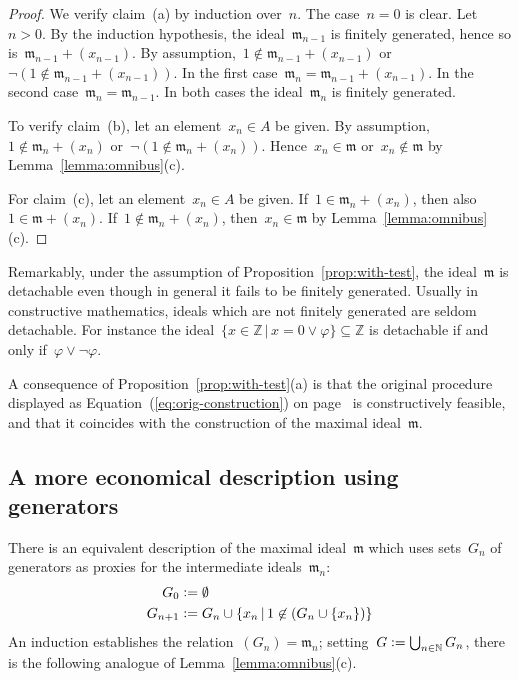 \documentclass[com,11pt,crcready]{iosart2x}
\theoremstyle{definition}
\theoremstyle{plain}
\theoremstyle{remark}
\newcommand{\?}{\,{:}\,}
\newcommand{\mmm}{\mathfrak{m}}
\newcommand{\NN}{\mathbb{N}}
\newcommand{\ZZ}{\mathbb{Z}}
\newcommand{\defeq}{\vcentcolon=}
\renewcommand{\_}{\mathpunct{.}\,}
\begin{document}
\begin{proof}We verify claim~(a) by induction over~$n$. The case~$n = 0$ is
clear. Let~$n > 0$. By the induction hypothesis, the ideal~$\mmm_{n-1}$ is finitely
generated, hence so is~$\mmm_{n-1} + (x_{n-1})$. By assumption,~$1 \not\in \mmm_{n-1} +
(x_{n-1})$ or~$\neg(1 \not\in \mmm_{n-1} + (x_{n-1}))$. In the first
case~$\mmm_n = \mmm_{n-1} + (x_{n-1})$. In the second case~$\mmm_n =
\mmm_{n-1}$. In both cases
the ideal~$\mmm_n$ is finitely generated.

To verify claim~(b), let an element~$x_n \in A$ be given. By assumption,~$1
\not\in \mmm_n + (x_n)$ or~$\neg(1 \not\in \mmm_n + (x_n))$. Hence~$x_n \in
\mmm$ or~$x_n \not\in \mmm$ by Lemma~\ref{lemma:omnibus}(c).

For claim~(c), let an element~$x_n \in A$ be given. If~$1 \in \mmm_n + (x_n)$,
then also~$1 \in \mmm + (x_n)$. If~$1 \not\in \mmm_n + (x_n)$, then~$x_n \in
\mmm$ by Lemma~\ref{lemma:omnibus}(c).
\end{proof}

Remarkably, under the assumption of Proposition~\ref{prop:with-test}, the ideal~$\mmm$ is detachable even though in
general it fails to be finitely generated. Usually in constructive mathematics, ideals which are not
finitely generated are seldom detachable. For instance the ideal~$\{ x \in
\ZZ \,|\, x = 0 \vee \varphi \} \subseteq \ZZ$ is detachable if and only
if~$\varphi \vee \neg\varphi$.

A consequence of Proposition~\ref{prop:with-test}(a) is that the original
procedure displayed as Equation~(\ref{eq:orig-construction}) on
page~\pageref{eq:orig-construction} is constructively feasible, and that it
coincides with the construction of the maximal ideal~$\mmm$.


\subsection{A more economical description using generators}

There is an equivalent description of the
maximal ideal~$\mmm$ which uses sets~$G_n$ of generators as proxies for the
intermediate ideals~$\mmm_n$:
\begin{align*}
  G_0 &\defeq \emptyset \\
  G_{n+1} &\defeq G_n \cup \{ x_n \,|\, 1 \not\in (G_n \cup \{ x_n \}) \}
\end{align*}
An induction establishes the relation~$(G_n) = \mmm_n$; setting~$G \defeq
\bigcup_{n\in\NN} G_n$, there is the following analogue of
Lemma~\ref{lemma:omnibus}(c).
\end{document}
